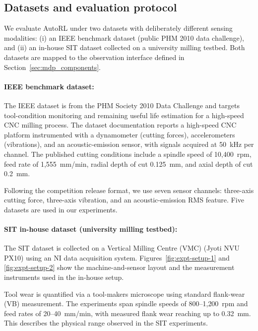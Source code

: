 \documentclass[sn-vancouver-num]{sn-jnl}%
\begin{document}
\subsection{Datasets and evaluation protocol} \label{sec:experiment} 

We evaluate AutoRL under two datasets with deliberately different sensing modalities: (i) an IEEE benchmark dataset (public PHM 2010 data challenge), and (ii) an in-house SIT dataset collected on a university milling testbed. Both datasets are mapped to the observation interface defined in Section~\ref{sec:mdp_components}.%

\paragraph{IEEE benchmark dataset:}
The IEEE dataset \cite{PHMdata2010} is from the PHM Society 2010 Data Challenge and targets tool-condition monitoring and remaining useful life estimation for a high-speed CNC milling process. The dataset documentation reports a high-speed CNC platform instrumented with a dynamometer (cutting forces), accelerometers (vibrations), and an acoustic-emission sensor, with signals acquired at 50~kHz per channel. The published cutting conditions include a spindle speed of 10{,}400~rpm, feed rate of 1{,}555~mm/min, radial depth of cut 0.125~mm, and axial depth of cut 0.2~mm.

Following the competition release format, we use seven sensor channels: three-axis cutting force, three-axis vibration, and an acoustic-emission RMS feature. Five datasets are used in our experiments.

\paragraph{SIT in-house dataset (university milling testbed):}
The SIT dataset is collected on a Vertical Milling Centre (VMC) (Jyoti NVU PX10) using an NI data acquisition system. Figures~\ref{fig:expt-setup-1} and \ref{fig:expt-setup-2} show the machine-and-sensor layout and the measurement instruments used in the in-house setup.

Tool wear is quantified via a tool-makers microscope using standard flank-wear (VB) measurement. The experiments span spindle speeds of 800--1{,}200~rpm and feed rates of 20--40~mm/min, with measured flank wear reaching up to 0.32~mm. This describes the physical range observed in the SIT experiments.
\end{document}
